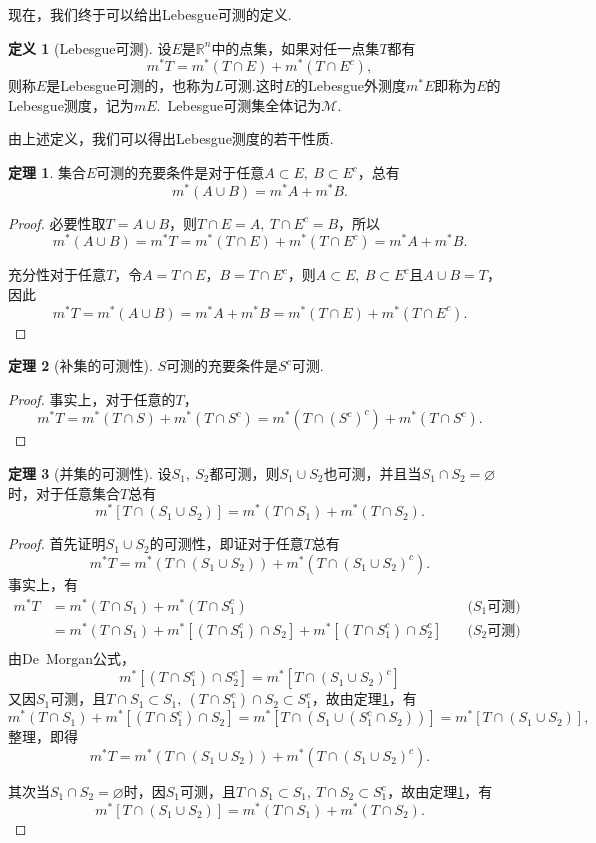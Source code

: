\documentclass[lang=cn,12pt]{ctexart}
\theoremstyle{definition}
\newtheorem{definition}{定义}
\newtheorem{theorem}{定理}
\theoremstyle{plain}
\begin{document}
现在，我们终于可以给出Lebesgue可测的定义.
\begin{definition}[Lebesgue可测]
	设$E$是$\mathbb{R}^n$中的点集，如果对任一点集$T$都有
	$$m^*T=m^*(T\cap E)+m^*(T\cap E^c),$$
	则称$E$是{\heiti Lebesgue可测的}，也称为$L${\heiti 可测}.这时$E$的Lebesgue外测度$m^*E$即称为$E$的{\heiti Lebesgue测度}，记为$mE$.\ Lebesgue可测集全体记为$\mathcal{M}$.
\end{definition}
由上述定义，我们可以得出Lebesgue测度的若干性质.
\begin{theorem}\label{submea}
	集合$E$可测的充要条件是对于任意$A\subset E,\ B\subset E^c$，总有
	$$m^*(A\cup B)=m^*A+m^*B.$$
\end{theorem}
\begin{proof}
	必要性\qquad 取$T=A\cup B$，则$T\cap E=A,\ T\cap E^c=B$，所以
	$$m^*(A\cup B)=m^*T=m^*(T\cap E)+m^*(T\cap E^c)=m^*A+m^*B.$$
	
	充分性\qquad 对于任意$T$，令$A=T\cap E$，$B=T\cap E^c$，则$A\subset E,\ B\subset E^c$且$A\cup B=T$，因此
	$$m^*T=m^*(A\cup B)=m^*A+m^*B=m^*(T\cap E)+m^*(T\cap E^c).$$
	
\end{proof}
\begin{theorem}[补集的可测性]
	$S$可测的充要条件是$S^c$可测.
\end{theorem}
\begin{proof}
	事实上，对于任意的$T$，
	$$m^*T=m^*(T\cap S)+m^*(T\cap S^c)=m^*(T\cap (S^c)^c)+m^*(T\cap S^c).$$
	
\end{proof}
\begin{theorem}[并集的可测性]
	设$S_1,\ S_2$都可测，则$S_1\cup S_2$也可测，并且当$S_1\cap S_2=\varnothing$时，对于任意集合$T$总有
	$$m^*\left[T\cap(S_1\cup S_2)\right]=m^*(T\cap S_1)+m^*(T\cap S_2).$$
\end{theorem}
\begin{proof}
	首先证明$S_1\cup S_2$的可测性，即证对于任意$T$总有
	$$m^*T=m^*(T\cap(S_1\cup S_2))+m^*(T\cap(S_1\cup S_2)^c).$$
	事实上，有
	\begin{align*}
		m^*T&=
		m^*(T\cap S_1)+m^*(T\cap S_1^c)\quad&\text{($S_1$可测)}\\
		&=m^*(T\cap S_1)+m^*\left[(T\cap S_1^c)\cap S_2\right]+m^*\left[(T\cap S_1^c)\cap S_2^c\right]\quad&\text{($S_2$可测)}\\			
	\end{align*}
	由De\ Morgan公式，
	$$m^*\left[(T\cap S_1^c)\cap S_2^c\right]=m^*\left[T\cap (S_1\cup S_2)^c\right]$$
	又因$S_1$可测，且$T\cap S_1\subset S_1,\ (T\cap S_1^c)\cap S_2\subset S_1^c$，故由定理\ref{submea}，有
	$$m^*(T\cap S_1)+m^*\left[(T\cap S_1^c)\cap S_2\right]=m^*\left[T\cap(S_1\cup (S_1^c\cap S_2))\right]=m^*\left[T\cap(S_1\cup S_2)\right],$$
	整理，即得
	$$m^*T=m^*(T\cap(S_1\cup S_2))+m^*(T\cap(S_1\cup S_2)^c).$$
	
	其次当$S_1\cap S_2=\varnothing$时，因$S_1$可测，且$T\cap S_1\subset S_1,\ T\cap S_2\subset S_1^c$，故由定理\ref{submea}，有
	$$m^*\left[T\cap(S_1\cup S_2)\right]=m^*(T\cap S_1)+m^*(T\cap S_2).$$
	
\end{proof}
\end{document}
